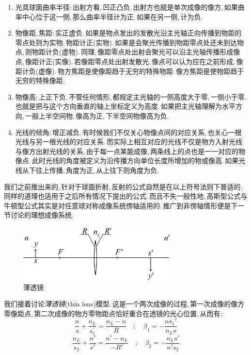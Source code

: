 \begin{enumerate}
	\item 光具球面曲率半径:\,{\hei 出射方看,\,凹正凸负.}\,出射方也就是单次成像的像方,\,如果曲率中心位于这一侧,\,那么曲率半径计为正.\,如果在另一侧,\,计为负.
	\item 物像距,\,焦距:\,{\hei 实正虚负.}\,如果是物点发出的发散光沿主光轴正向传播到物距的零点处则为实物,\,物距计正(实物).\,如果是会聚光传播到物距零点处还未到达物点,\,则物距计负(虚物).\,同理,\,像距零点处出射会聚光可以沿主光轴传播形成像点,\,像距计正(实像).\,若像距零点处出射发散光,\,像点可以认为应在之前形成,\,像距计负(虚像).\,物方焦距是使像距趋于无穷的特殊物距.\,像方焦距是使物距趋于无穷的特殊像距.
	\item 物像高:\,{\hei 上正下负.}\,不管任何情形,\,都规定主光轴的一侧高度大于零,\,一侧小于零.\,也就是把与这个方向垂直的轴上坐标定义为高度.\,如果把主光轴理解为水平方向,\,一般上半空间物,\,像高为正,\,下半空间物像高为负.
	\item 光线的倾角:\,{\hei 增正减负.}\,有时候我们不仅关心物像点间的对应关系,\,也关心一根光线与另一根光线的对应关系.\,而实际上相互对应的光线不仅是物方入射光线与像方出射光线的关系,\,由于每一点某能成像,\,两条线上的点也是一一对应的物像点.\,此时光线的角度被定义为沿传播方向单位长度所增加的物或像高.\,如果光线从下往上传播,\,角度为正,\,从上往下则角度为负.
\end{enumerate}

我们之前推出来的,\,针对于球面折射,\,反射的公式自然是在以上符号法则下普适的.\,同样的道理也适用于之后所有情况下提出的公式.\,而且不失一般性地,\,高斯型公式与牛顿型公式其实是对任意球对称成像系统傍轴适用的.\,推广到非傍轴情形便是下一节讨论的理想成像系统.

\begin{figure}
\centering
\vspace{0cm}
\includegraphics[width=8cm]{image/5-7-5.png}
\caption{薄透镜}
\end{figure}
我们接着讨论\emph{薄透镜}(thin lens)模型.\,这是一个两次成像的过程,\,第一次成像的像方零像距点,\,第二次成像的物方零物距点恰好重合在透镜的光心位置.\,从而有:
\[\frac{n}{s}+\frac{n_L}{s_1^\prime}=\frac{n_L-n}{R}\quad ;\quad \beta_1=-\frac{ns_1'}{n_L s}\]
\[\frac{n_L}{s_2}+\frac{n'}{s'}=\frac{n'-n_L}{-R'}\quad ;\quad \beta_2=-\frac{n_L s'}{n's_2}\]

